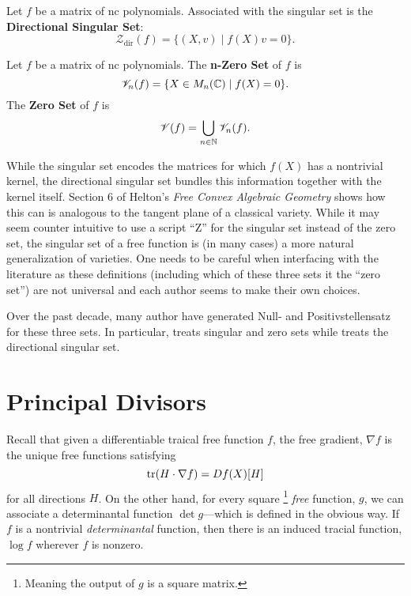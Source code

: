 \begin{definition}%
  Let \(f\) be a matrix of nc polynomials. Associated with the singular set is
  the \textbf{Directional Singular Set}:
  \[
    \mathscr{Z}_{\textrm{dir}}(f) = \{(X,v) \mid f(X)v = 0\}.
  \]
\end{definition}

\begin{definition}%
\label{def:zeroset}
  Let \(f\) be a matrix of nc polynomials. The \textbf{n-Zero Set} of \(f\) is
  \[
    \mathscr{V}_n(f) = \{X \in M_n (\mathbb{C}) \mid f(X) =0\}.
  \]
  The \textbf{Zero Set} of \(f\) is
  \[
    \mathscr{V}(f) = \bigcup_{n \in \mathbb{N} } \mathscr{V}_n(f).
  \]
\end{definition}

While the singular set encodes the matrices for which \(f(X)\) has a nontrivial
kernel, the directional singular set bundles this information together with the
kernel itself. Section 6 of Helton's \emph{Free Convex Algebraic Geometry}
\cite{heltonFree2013} shows how this can is analogous to the tangent plane of a
classical variety. While it may seem counter intuitive to use a script ``Z''
for the singular set instead of the zero set, the singular set of a free
function is (in many cases) a more natural generalization of varieties.
One needs to be careful when interfacing with the literature as these
definitions (including which of these three sets it the ``zero set'') are not
universal and each author seems to make their own choices.

Over the past decade, many author have generated Null- and
Positivstellensatz for these three sets. In particular,
\cite{heltonFactorization2019} treats singular and zero sets while
\cite{heltonStrong2007} treats the directional singular set.

\section{Principal Divisors}%
\label{sec:prindiv}

Recall that given a differentiable traical free function \(f\), the free
gradient, \(\nabla f\) is the unique free functions satisfying
\[
  \operatorname{tr} (H \cdot \nabla f) = Df(X)[H]
\]
for all directions \(H\). On the other hand, for every square
\footnote{Meaning the output of \(g\) is a square matrix.}
\emph{free} function, \(g\), we can associate a determinantal function
\(\det g\)---which is defined in the obvious way. If \(f\) is a nontrivial
\emph{determinantal} function, then there is an induced tracial function,
\(\log f\) wherever \(f\) is nonzero.


